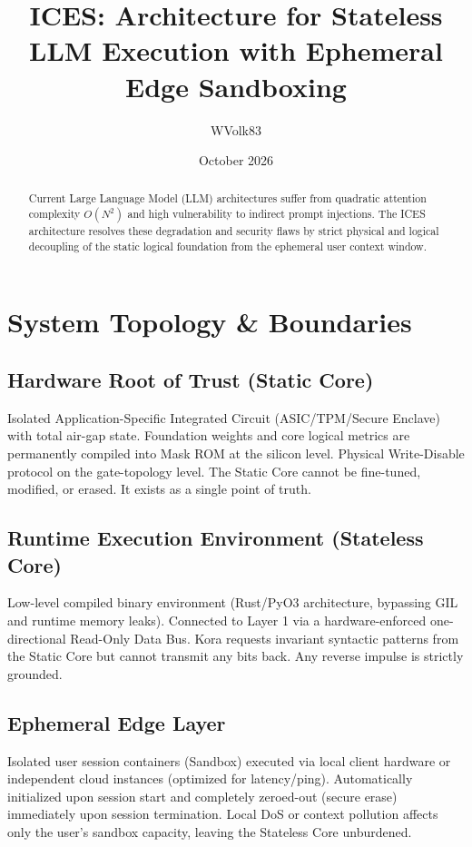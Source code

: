 \documentclass[11pt,twocolumn]{article}
\title{ICES: Architecture for Stateless LLM Execution with Ephemeral Edge Sandboxing}
\author{WVolk83}
\date{October 2026}
\begin{document}
\maketitle

\begin{abstract}
Current Large Language Model (LLM) architectures suffer from quadratic attention complexity $O(N^2)$ and high vulnerability to indirect prompt injections. The ICES architecture resolves these degradation and security flaws by strict physical and logical decoupling of the static logical foundation from the ephemeral user context window.
\end{abstract}

\section{System Topology \& Boundaries}
\subsection{Hardware Root of Trust (Static Core)}
Isolated Application-Specific Integrated Circuit (ASIC/TPM/Secure Enclave) with total air-gap state. Foundation weights and core logical metrics are permanently compiled into Mask ROM at the silicon level. Physical Write-Disable protocol on the gate-topology level. The Static Core cannot be fine-tuned, modified, or erased. It exists as a single point of truth.

\subsection{Runtime Execution Environment (Stateless Core)}
Low-level compiled binary environment (Rust/PyO3 architecture, bypassing GIL and runtime memory leaks). Connected to Layer 1 via a hardware-enforced one-directional Read-Only Data Bus. Kora requests invariant syntactic patterns from the Static Core but cannot transmit any bits back. Any reverse impulse is strictly grounded.

\subsection{Ephemeral Edge Layer}
Isolated user session containers (Sandbox) executed via local client hardware or independent cloud instances (optimized for latency/ping). Automatically initialized upon session start and completely zeroed-out (secure erase) immediately upon session termination. Local DoS or context pollution affects only the user's sandbox capacity, leaving the Stateless Core unburdened.
\end{document}
